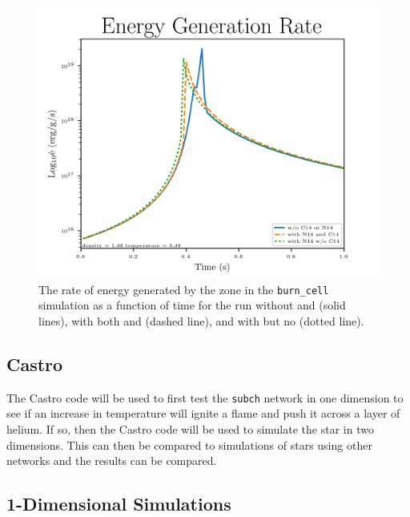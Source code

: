 \documentclass[preprint]{aastex62}
\begin{document}
      \begin{figure}
        \centering
        \includegraphics[width=5in]{images/subch_nC14nN14_edot_tol-10.png}
        \caption{The rate of energy generated by the zone in the {\tt burn\_cell} simulation as a function of time for the run without  and  (solid lines), with both  and  (dashed line), and with  but no  (dotted line).
          }
        \label{fig:energygeneration}
      \end{figure} 
  
  \subsection{Castro}
  
    The Castro code will be used to first test the {\tt subch} network in one dimension to see if an increase in temperature will ignite a flame and push it across a layer of helium. If so, then the Castro code will be used to simulate the star in two dimensions. This can then be compared to simulations of stars using other networks and the results can be compared. 
    
    \subsection{1-Dimensional Simulations}
    
\end{document}
